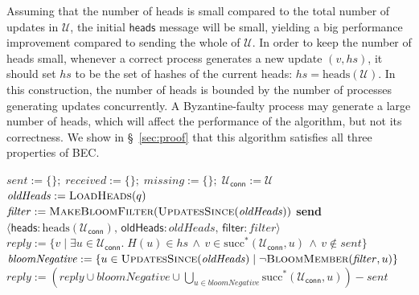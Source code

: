 \documentclass[a4paper,anonymous,USenglish]{lipics-v2019}
\begin{document}
Assuming that the number of heads is small compared to the total number of updates in $\mathcal{U}$, the initial $\mathsf{heads}$ message will be small, yielding a big performance improvement compared to sending the whole of $\mathcal{U}$.
In order to keep the number of heads small, whenever a correct process generates a new update $(v, \mathit{hs})$, it should set $\mathit{hs}$ to be the set of hashes of the current heads:
$\mathit{hs} = \mathrm{heads}(\mathcal{U})$.
In this construction, the number of heads is bounded by the number of processes generating updates concurrently.
A Byzantine-faulty process may generate a large number of heads, which will affect the performance of the algorithm, but not its correctness.
We show in \S~\ref{sec:proof} that this algorithm satisfies all three properties of BEC.

\begin{algorithm}[t]
    \begin{algorithmic}[1]
        \State $\mathit{sent} := \{\};\; \mathit{received} := \{\};\; \mathit{missing} := \{\};\; \mathcal{U}_\mathsf{conn} := \mathcal{U}$ 
        \State $\mathit{oldHeads} := \Call{LoadHeads}{q}$\label{line:load-heads}
        \State $\mathit{filter} := \textsc{MakeBloomFilter}(\Call{UpdatesSince}{\mathit{oldHeads}})$\label{line:make-bloom}
        \State \textbf{send} $\langle\mathsf{heads}: \mathrm{heads}(\mathcal{U}_\mathsf{conn}),\, \mathsf{oldHeads}: \mathit{oldHeads},\, \mathsf{filter}: \mathit{filter}\rangle$ \label{line:a2-send-heads}
    \EndOn
    \State
    \label{line:a2-recv-heads}
        \State $\mathit{reply} := \{v \mid \exists u \in \mathcal{U}_\mathsf{conn}.\; H(u) \in \mathit{hs} \,\wedge\, v \in \mathrm{succ}^*(\mathcal{U}_\mathsf{conn}, u) \,\wedge\, v \notin \mathit{sent}\}$ \label{line:a2-succ}
        \State $\mathit{bloomNegative} := \{u \in \Call{UpdatesSince}{\mathit{oldHeads}} \mid \neg\Call{BloomMember}{\mathit{filter}, u}\}$\label{line:bloom-member}
        \State $\mathit{reply} := \left(\mathit{reply} \cup \mathit{bloomNegative} \cup \bigcup_{u \in \mathit{bloomNegative}} \mathrm{succ}^*(\mathcal{U}_\mathsf{conn}, u)\right) - \mathit{sent}$\label{line:bloom-succ}

\end{algorithmic}
\end{algorithm}
\end{document}
